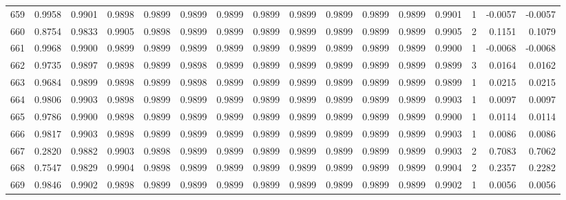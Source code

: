 \begin{tabular}{lrrrrrrrrrrrrrrr}
659 &      0.9958 &  0.9901 &  0.9898 &  0.9899 &  0.9899 &  0.9899 &  0.9899 &  0.9899 &  0.9899 &  0.9899 &   0.9899 &     0.9901 &      1 &                   -0.0057 &                    -0.0057 \\
660 &      0.8754 &  0.9833 &  0.9905 &  0.9898 &  0.9899 &  0.9899 &  0.9899 &  0.9899 &  0.9899 &  0.9899 &   0.9899 &     0.9905 &      2 &                    0.1151 &                     0.1079 \\
661 &      0.9968 &  0.9900 &  0.9899 &  0.9899 &  0.9899 &  0.9899 &  0.9899 &  0.9899 &  0.9899 &  0.9899 &   0.9899 &     0.9900 &      1 &                   -0.0068 &                    -0.0068 \\
662 &      0.9735 &  0.9897 &  0.9898 &  0.9899 &  0.9898 &  0.9899 &  0.9899 &  0.9899 &  0.9899 &  0.9899 &   0.9899 &     0.9899 &      3 &                    0.0164 &                     0.0162 \\
663 &      0.9684 &  0.9899 &  0.9898 &  0.9899 &  0.9898 &  0.9899 &  0.9899 &  0.9899 &  0.9899 &  0.9899 &   0.9899 &     0.9899 &      1 &                    0.0215 &                     0.0215 \\
664 &      0.9806 &  0.9903 &  0.9898 &  0.9899 &  0.9899 &  0.9899 &  0.9899 &  0.9899 &  0.9899 &  0.9899 &   0.9899 &     0.9903 &      1 &                    0.0097 &                     0.0097 \\
665 &      0.9786 &  0.9900 &  0.9898 &  0.9899 &  0.9899 &  0.9899 &  0.9899 &  0.9899 &  0.9899 &  0.9899 &   0.9899 &     0.9900 &      1 &                    0.0114 &                     0.0114 \\
666 &      0.9817 &  0.9903 &  0.9898 &  0.9899 &  0.9899 &  0.9899 &  0.9899 &  0.9899 &  0.9899 &  0.9899 &   0.9899 &     0.9903 &      1 &                    0.0086 &                     0.0086 \\
667 &      0.2820 &  0.9882 &  0.9903 &  0.9898 &  0.9899 &  0.9899 &  0.9899 &  0.9899 &  0.9899 &  0.9899 &   0.9899 &     0.9903 &      2 &                    0.7083 &                     0.7062 \\
668 &      0.7547 &  0.9829 &  0.9904 &  0.9898 &  0.9899 &  0.9899 &  0.9899 &  0.9899 &  0.9899 &  0.9899 &   0.9899 &     0.9904 &      2 &                    0.2357 &                     0.2282 \\
669 &      0.9846 &  0.9902 &  0.9898 &  0.9899 &  0.9899 &  0.9899 &  0.9899 &  0.9899 &  0.9899 &  0.9899 &   0.9899 &     0.9902 &      1 &                    0.0056 &                     0.0056 \\

\end{tabular}

